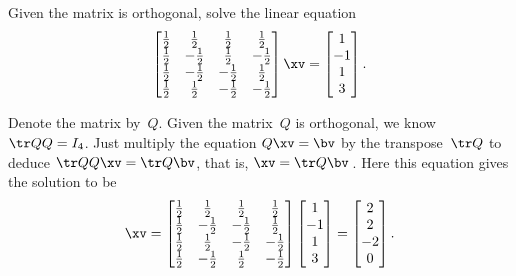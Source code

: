 \begin{example} \label{eg:}
Given the matrix is orthogonal, solve the linear equation
\begin{equation*}
\begin{bmatrix} 
  \frac12&\frac12&\frac12&\frac12
\\\frac12&-\frac12&\frac12&-\frac12
\\\frac12&-\frac12&-\frac12&\frac12
\\\frac12&\frac12&-\frac12&-\frac12 \end{bmatrix}\xv
=\begin{bmatrix} 1\\-1\\1\\3 \end{bmatrix}.
\end{equation*}
\begin{solution} 
Denote the matrix by~\(Q\).
Given the matrix~\(Q\) is orthogonal, we know \(\tr QQ=I_4\). 
Just multiply the equation \(Q\xv=\bv\) by the transpose~\(\tr Q\) to deduce \(\tr QQ\xv=\tr Q\bv\), that is, \(\xv=\tr Q\bv\)\,.  
Here this equation gives the solution to be
\begin{equation*}
\xv=\begin{bmatrix} 
  \frac12&\frac12&\frac12&\frac12
\\\frac12&-\frac12&-\frac12&\frac12
\\\frac12&\frac12&-\frac12&-\frac12
\\\frac12&-\frac12&\frac12&-\frac12 \end{bmatrix}
\begin{bmatrix} 1\\-1\\1\\3 \end{bmatrix}
=\begin{bmatrix} 2\\2\\-2\\0 \end{bmatrix}.
\end{equation*}
\end{solution}
\end{example}


